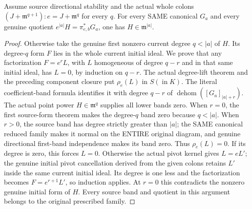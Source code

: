 \begin{theorem}
\label{hir:actual-directional-canonical-order-of-current-colons}
\leanok
Assume source directional stability and the actual whole colons
$(J+\mathfrak m^{q+1}):e=J+\mathfrak m^q$ for every $q$.
For every SAME canonical $G_a$ and every genuine quotient
$e^{|a|}H=\pi_{e,b}^*G_a$, one has $H\in\mathfrak m^{|a|}$.
\end{theorem}
\begin{proof}
Otherwise take the genuine first nonzero current degree $q<|a|$ of $H$.
Its degree-$q$ form $F$ lies in the whole current initial ideal. We prove
that any factorization $F=e^rL$, with $L$ homogeneous of degree $q-r$ and
in that same initial ideal, has $L=0$, by induction on $q-r$.
The actual degree-lift theorem and the preceding component closure put
$\rho_e(L)$ in $S(\operatorname{in}K)$. The literal coefficient-band
formula identifies it with degree $q-r$ of
$\operatorname{dehom}([G_a]_{|a|+r})$. The actual point power
$H\in\mathfrak m^q$ supplies all lower bands zero. When $r=0$, the first
source-form theorem makes the degree-$q$ band zero because $q<|a|$.
When $r>0$, the source band has degree strictly greater than $|a|$;
the SAME canonical reduced family makes it normal on the ENTIRE original
diagram, and genuine directional first-band independence makes its band
zero. Thus $\rho_e(L)=0$. If its degree is zero, this forces $L=0$.
Otherwise the actual pivot kernel gives $L=eL'$; the genuine initial
pivot cancellation derived from the given colons retains $L'$ inside the
same current initial ideal. Its degree is one less and the factorization
becomes $F=e^{r+1}L'$, so induction applies. At $r=0$ this contradicts the
nonzero genuine initial form of $H$. Every source band and quotient in
this argument belongs to the original prescribed family.
\end{proof}


